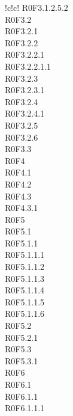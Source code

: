 \begin{tabella}{!{\VRule}c!{\VRule}c!{\VRule}}
{					R0F3.1.2.5.2 \\
					R0F3.2 \\
					R0F3.2.1 \\
					R0F3.2.2 \\
					R0F3.2.2.1 \\
					R0F3.2.2.1.1 \\
					R0F3.2.3 \\
					R0F3.2.3.1 \\
					R0F3.2.4 \\
					R0F3.2.4.1 \\
					R0F3.2.5 \\
					R0F3.2.6 \\
					R0F3.3 \\
					R0F4 \\
					R0F4.1 \\
					R0F4.2 \\
					R0F4.3 \\
					R0F4.3.1 \\
					R0F5 \\
					R0F5.1 \\
					R0F5.1.1 \\
					R0F5.1.1.1 \\
					R0F5.1.1.2 \\
					R0F5.1.1.3 \\
					R0F5.1.1.4 \\
					R0F5.1.1.5 \\
					R0F5.1.1.6 \\
					R0F5.2 \\
					R0F5.2.1 \\
					R0F5.3 \\
					R0F5.3.1 \\
					R0F6 \\
					R0F6.1 \\
					R0F6.1.1 \\
					R0F6.1.1.1 \\
				} \\ 
					

\end{tabella}

